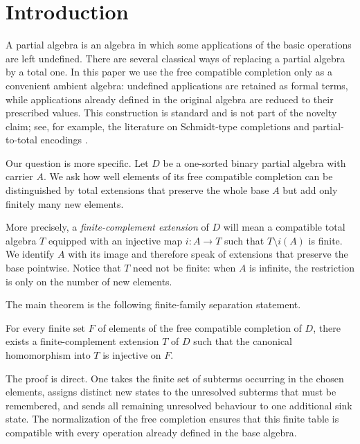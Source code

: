 \section{Introduction}\label{sec:introduction}

A partial algebra is an algebra in which some applications of the basic
operations are left undefined.  There are several classical ways of replacing
a partial algebra by a total one.  In this paper we use the free compatible
completion only as a convenient ambient algebra: undefined applications are
retained as formal terms, while applications already defined in the original
algebra are reduced to their prescribed values.  This construction is standard
and is not part of the novelty claim; see, for example, the literature on
Schmidt-type completions and partial-to-total encodings
\cite{ClimentVidalCosmeLlopez2023,Diaconescu2009}.

Our question is more specific.  Let $D$ be a one-sorted binary partial algebra
with carrier $A$.  We ask how well elements of its free compatible completion
can be distinguished by total extensions that preserve the whole base $A$ but
add only finitely many new elements.

More precisely, a \emph{finite-complement extension} of $D$ will mean a
compatible total algebra $T$ equipped with an injective map $i:A\to T$ such
that $T\setminus i(A)$ is finite.  We identify $A$ with its image and therefore
speak of extensions that preserve the base pointwise.  Notice that $T$ need
not be finite: when $A$ is infinite, the restriction is only on the number of
new elements.

The main theorem is the following finite-family separation statement.

\begin{theorem}
\label{thm:intro-finite-family}
For every finite set $F$ of elements of the free compatible completion of $D$,
there exists a finite-complement extension $T$ of $D$ such that the canonical
homomorphism into $T$ is injective on $F$.
\end{theorem}

The proof is direct.  One takes the finite set of subterms occurring in the
chosen elements, assigns distinct new states to the unresolved subterms that
must be remembered, and sends all remaining unresolved behaviour to one
additional sink state.  The normalization of the free completion ensures that
this finite table is compatible with every operation already defined in the
base algebra.

